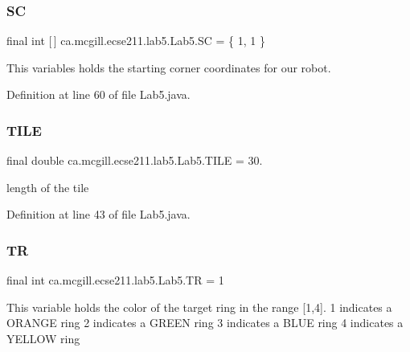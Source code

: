 \subsubsection{\texorpdfstring{SC}{SC}}
{\footnotesize\ttfamily final int \mbox{[}$\,$\mbox{]} ca.\+mcgill.\+ecse211.\+lab5.\+Lab5.\+SC = \{ 1, 1 \}\hspace{0.3cm}{\ttfamily [static]}}

This variables holds the starting corner coordinates for our robot. 

Definition at line 60 of file Lab5.\+java.

\mbox{\label{classca_1_1mcgill_1_1ecse211_1_1lab5_1_1_lab5_a099ba21be1cd8d54a57c40cd0d35701d}} 
\subsubsection{\texorpdfstring{T\+I\+LE}{TILE}}
{\footnotesize\ttfamily final double ca.\+mcgill.\+ecse211.\+lab5.\+Lab5.\+T\+I\+LE = 30.\hspace{0.3cm}{\ttfamily [static]}}

length of the tile 

Definition at line 43 of file Lab5.\+java.

\mbox{\label{classca_1_1mcgill_1_1ecse211_1_1lab5_1_1_lab5_a0dd5ea6f697d2221ed8c8bb4df1cac7f}} 
\subsubsection{\texorpdfstring{TR}{TR}}
{\footnotesize\ttfamily final int ca.\+mcgill.\+ecse211.\+lab5.\+Lab5.\+TR = 1\hspace{0.3cm}{\ttfamily [static]}}

This variable holds the color of the target ring in the range \mbox{[}1,4\mbox{]}. 1 indicates a O\+R\+A\+N\+GE ring 2 indicates a G\+R\+E\+EN ring 3 indicates a B\+L\+UE ring 4 indicates a Y\+E\+L\+L\+OW ring 

